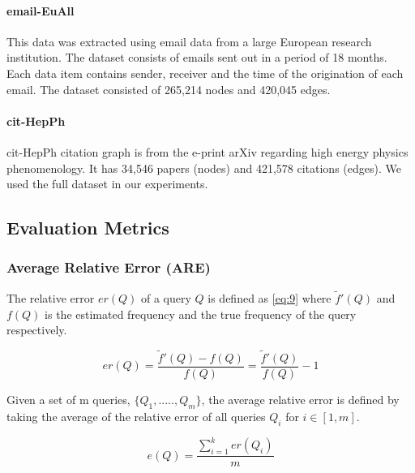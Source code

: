 \paragraph{email-EuAll\cite{leskovec_graph_2007}}
This data was extracted using email data from a large European research institution. The dataset consists of emails sent out in a period of 18 months. Each data item contains sender, receiver and the time of the origination of each email. The dataset consisted of 265,214 nodes and 420,045 edges\cite{noauthor_snap_nodate_email}. 

\paragraph{cit-HepPh\cite{gehrke_overview_2003}}
cit-HepPh citation graph is from the e-print arXiv regarding high energy physics phenomenology. It has 34,546 papers (nodes) and 421,578 citations (edges). We used the full dataset in our experiments. 

\subsection{Evaluation Metrics}
\label{section:design_evaluation_metrics}

\subsubsection{Average Relative Error (ARE)}
\label{section:metrics_are}

The relative error \(er(Q)\) of a query \(Q\) is defined as \eqref{eq:9} where \(\tilde{f}'(Q)\) and \(f(Q)\) is the estimated frequency and the true frequency of the query respectively.

\begin{equation}
    er(Q) =  \frac{\tilde{f}'(Q) - f(Q)}{f(Q)} = \frac{\tilde{f}'(Q)}{f(Q)} -1
    \label{eq:9}
\end{equation}

Given a set of m queries, $\{ Q_1 , ....., Q_m \}$, the average relative error is defined by taking the average of the relative error of all queries $Q_i$ for \(i \in [1,m]\).

\begin{equation}
    e(Q) =  \frac{\sum_{i=1}^{k} er(Q_i)}{m}
\end{equation}

